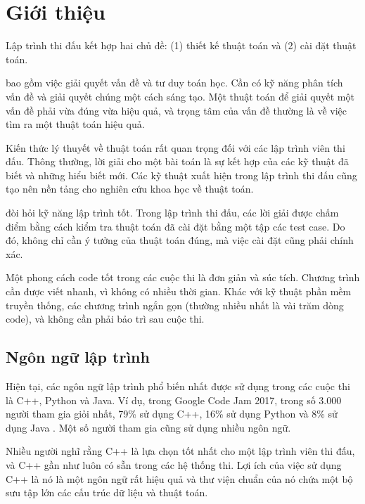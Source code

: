 \chapter{Giới thiệu}

Lập trình thi đấu kết hợp hai chủ đề:
(1) thiết kế thuật toán và (2) cài đặt thuật toán.

 bao gồm việc giải quyết vấn đề
và tư duy toán học.
Cần có kỹ năng phân tích vấn đề và giải quyết chúng
một cách sáng tạo.
Một thuật toán để giải quyết một vấn đề
phải vừa đúng vừa hiệu quả,
và trọng tâm của vấn đề thường là
về việc tìm ra một thuật toán hiệu quả.

Kiến thức lý thuyết về thuật toán
rất quan trọng đối với các lập trình viên thi đấu.
Thông thường, lời giải cho một bài toán là
sự kết hợp của các kỹ thuật đã biết và
những hiểu biết mới.
Các kỹ thuật xuất hiện trong lập trình thi đấu
cũng tạo nên nền tảng cho nghiên cứu khoa học
về thuật toán.

 đòi hỏi kỹ năng
lập trình tốt.
Trong lập trình thi đấu, các lời giải
được chấm điểm bằng cách kiểm tra thuật toán đã cài đặt
bằng một tập các test case.
Do đó, không chỉ cần ý tưởng của thuật toán
đúng, mà việc cài đặt cũng
phải chính xác.

Một phong cách code tốt trong các cuộc thi là
đơn giản và súc tích.
Chương trình cần được viết nhanh,
vì không có nhiều thời gian.
Khác với kỹ thuật phần mềm truyền thống,
các chương trình ngắn gọn (thường nhiều nhất là vài
trăm dòng code), và không cần phải
bảo trì sau cuộc thi.

\section{Ngôn ngữ lập trình}


Hiện tại, các ngôn ngữ lập trình phổ biến nhất
được sử dụng trong các cuộc thi là C++, Python và Java.
Ví dụ, trong Google Code Jam 2017,
trong số 3.000 người tham gia giỏi nhất,
79\% sử dụng C++,
16\% sử dụng Python và
8\% sử dụng Java \cite{goo17}.
Một số người tham gia cũng sử dụng nhiều ngôn ngữ.

Nhiều người nghĩ rằng C++ là lựa chọn tốt nhất
cho một lập trình viên thi đấu,
và C++ gần như luôn có sẵn trong
các hệ thống thi.
Lợi ích của việc sử dụng C++ là
nó là một ngôn ngữ rất hiệu quả và
thư viện chuẩn của nó chứa
một bộ sưu tập lớn
các cấu trúc dữ liệu và thuật toán.

